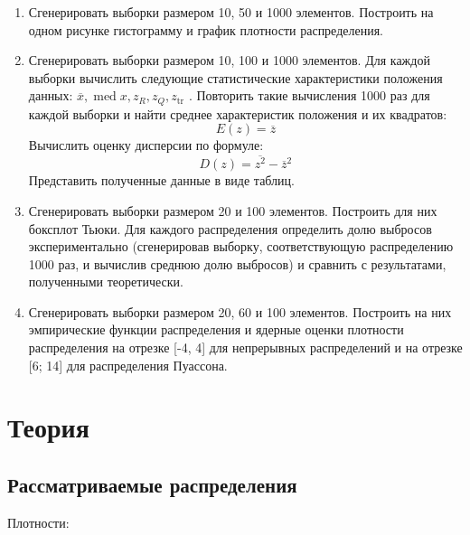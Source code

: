 \documentclass[12pt]{article}
\DeclareMathOperator{\med}{med}
\begin{document}
	\begin{enumerate}
		\item Сгенерировать выборки размером 10, 50 и 1000 элементов. Построить на одном рисунке гистограмму и график плотности распределения.
		\item  Сгенерировать выборки размером 10, 100 и 1000 элементов.	Для каждой выборки вычислить следующие статистические характеристики положения данных: $\overline{x}, \med x, z_R, z_Q, z_{\text{tr}}$ . Повторить такие вычисления 1000 раз для каждой выборки и найти среднее характеристик положения и их квадратов:
		\begin{equation}
			E(z) = \overline{z}
		\end{equation}
		Вычислить оценку дисперсии по формуле:
		\begin{equation}
			D(z) = \overline{z^2} - \overline{z}^2
		\end{equation}
		Представить полученные данные в виде таблиц.

		\item Сгенерировать выборки размером 20 и 100 элементов. Построить для них боксплот Тьюки.
		Для каждого распределения определить долю выбросов экспериментально (сгенерировав выборку, соответствующую распределению 1000 раз, и вычислив среднюю долю выбросов) и сравнить с результатами, полученными теоретически.
		\item Сгенерировать выборки размером 20, 60 и 100 элементов. Построить на них эмпирические функции распределения и ядерные оценки плотности распределения на отрезке [-4, 4] для непрерывных распределений и на отрезке [6; 14] для распределения Пуассона.
	\end{enumerate}

	\section{Теория}
	
	\subsection{Рассматриваемые распределения}
	
	Плотности:
	
\end{document}
